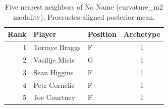 \begin{table}[htbp]
  \centering\small
  \begin{tabular}{rllc}
    \toprule
    Rank & Player & Position & Archetype \\
    \midrule
    1 & Torraye Braggs & F & 1 \\
    2 & Vasilije Micic & G & 1 \\
    3 & Sean Higgins & F & 1 \\
    4 & Petr Cornelie & F & 1 \\
    5 & Joe Courtney & F & 1 \\
    \bottomrule
  \end{tabular}
  \caption{Five nearest neighbors of No Name (curvature_m2 modality), Procrustes-aligned posterior mean.}
  \label{tab:No_Name_neighbors_curvature_m2}
\end{table}

